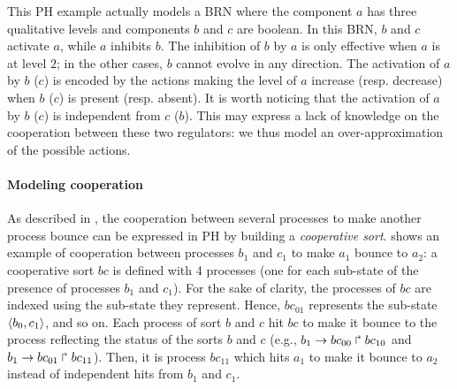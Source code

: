 \begin{example*}
This PH example actually models a BRN where the component $a$ has three qualitative
levels and components $b$ and $c$ are boolean.
In this BRN, $b$ and $c$ activate $a$, while $a$ inhibits $b$.
The inhibition of $b$ by $a$ is only effective when $a$ is at level $2$;
in the other cases, $b$ cannot evolve in any direction.
The activation of $a$ by $b$ ($c$) is encoded by the actions making the level of $a$ increase (resp.
decrease) when $b$ ($c$) is present (resp. absent).
It is worth noticing that the activation of $a$ by $b$ ($c$) is independent from $c$ ($b$).
This may express a lack of knowledge on the cooperation between these two regulators:
we thus model an over-approximation of the possible actions.
\end{example*}

\paragraph{Modeling cooperation}
As described in \cite{PMR10-TCSB}, the cooperation between several processes to make another process bounce can be
expressed in PH by building a \emph{cooperative sort}.
 shows an example of cooperation between processes $b_1$ and $c_1$ to
make $a_1$ bounce to $a_2$:
a cooperative sort $bc$ is defined with 4 processes (one for each sub-state of the presence of
processes $b_1$ and $c_1$).
For the sake of clarity, the processes of $bc$ are indexed using the sub-state they represent.
Hence, $bc_{01}$ represents the sub-state $\langle b_0,c_1 \rangle$, and so on.
Each process of sort $b$ and $c$ hit $bc$ to make it bounce to the process reflecting the status of the sorts $b$
and $c$ (e.g., $b_1\rightarrow bc_{00}\Rsh bc_{10}$ and $b_1\rightarrow bc_{01}\Rsh bc_{11}$).
Then, it is process $bc_{11}$ which hits $a_1$ to make it bounce to $a_2$ instead of
independent hits from $b_1$ and $c_1$.

